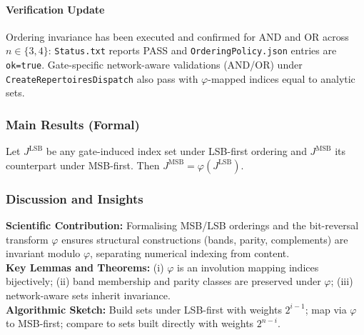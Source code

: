 \documentclass{article}
\begin{document}
\paragraph{Verification Update} Ordering invariance has been executed and confirmed for AND and OR across \(n\in\{3,4\}\): \texttt{Status.txt} reports PASS and \texttt{OrderingPolicy.json} entries are \texttt{ok=true}. Gate-specific network-aware validations (AND/OR) under \texttt{CreateRepertoiresDispatch} also pass with \(\varphi\)-mapped indices equal to analytic sets.
\subsubsection*{Main Results (Formal)}
\begin{theorem}
Let \(J^{\mathrm{LSB}}\) be any gate-induced index set under LSB-first ordering and \(J^{\mathrm{MSB}}\) its counterpart under MSB-first. Then \(J^{\mathrm{MSB}}=\varphi(J^{\mathrm{LSB}})\).
\end{theorem}
\subsubsection*{Discussion and Insights}
\textbf{Scientific Contribution:} Formalising MSB/LSB orderings and the bit-reversal transform \(\varphi\) ensures structural constructions (bands, parity, complements) are invariant modulo \(\varphi\), separating numerical indexing from content.\\
\textbf{Key Lemmas and Theorems:} (i) \(\varphi\) is an involution mapping indices bijectively; (ii) band membership and parity classes are preserved under \(\varphi\); (iii) network-aware sets inherit invariance.\\
\textbf{Algorithmic Sketch:} Build sets under LSB-first with weights \(2^{i-1}\); map via \(\varphi\) to MSB-first; compare to sets built directly with weights \(2^{n-i}\).
\end{document}
